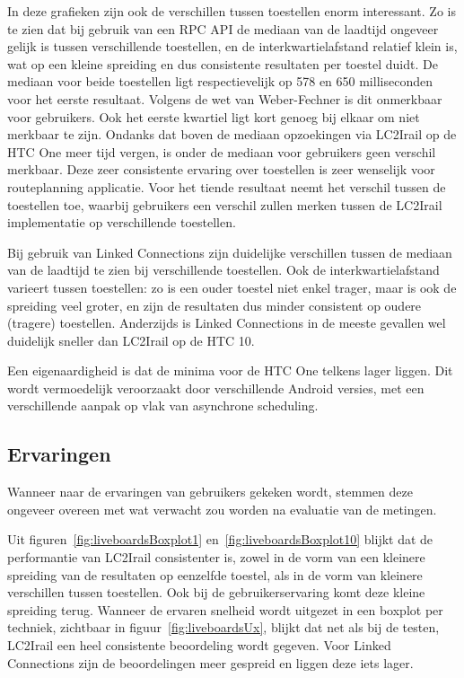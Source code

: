 In deze grafieken zijn ook de verschillen tussen toestellen enorm interessant. Zo is te zien dat bij gebruik van een RPC API de mediaan van de laadtijd ongeveer gelijk is tussen verschillende toestellen, en de interkwartielafstand relatief klein is, wat op een kleine spreiding en dus consistente resultaten per toestel duidt. De mediaan voor beide toestellen ligt respectievelijk op 578 en 650 milliseconden voor het eerste resultaat. Volgens de wet van Weber-Fechner is dit onmerkbaar voor gebruikers. Ook het eerste kwartiel ligt kort genoeg bij elkaar om niet merkbaar te zijn. Ondanks dat boven de mediaan opzoekingen via LC2Irail op de HTC One meer tijd vergen, is onder de mediaan voor gebruikers geen verschil merkbaar. Deze zeer consistente ervaring over toestellen is zeer wenselijk voor routeplanning applicatie. Voor het tiende resultaat neemt het verschil tussen de toestellen toe, waarbij gebruikers een verschil zullen merken tussen de LC2Irail implementatie op verschillende toestellen.

Bij gebruik van Linked Connections zijn duidelijke verschillen tussen de mediaan van de laadtijd te zien bij verschillende toestellen. Ook de interkwartielafstand varieert tussen toestellen: zo is een ouder toestel niet enkel trager, maar is ook de spreiding veel groter, en zijn de resultaten dus minder consistent op oudere (tragere) toestellen. Anderzijds is Linked Connections in de meeste gevallen wel duidelijk sneller dan LC2Irail op de HTC 10.

Een eigenaardigheid is dat de minima voor de HTC One telkens lager liggen. Dit wordt vermoedelijk veroorzaakt door verschillende Android versies, met een verschillende aanpak op vlak van asynchrone scheduling.

\subsection{Ervaringen}
Wanneer naar de ervaringen van gebruikers gekeken wordt, stemmen deze ongeveer overeen met wat verwacht zou worden na evaluatie van de metingen.

Uit figuren~\ref{fig:liveboardsBoxplot1} en~\ref{fig:liveboardsBoxplot10} blijkt dat de performantie van LC2Irail consistenter is, zowel in de vorm van een kleinere spreiding van de resultaten op eenzelfde toestel, als in de vorm van kleinere verschillen tussen toestellen. Ook bij de gebruikerservaring komt deze kleine spreiding terug. Wanneer de ervaren snelheid wordt uitgezet in een boxplot per techniek, zichtbaar in figuur~\ref{fig:liveboardsUx}, blijkt dat net als bij de testen, LC2Irail een heel consistente beoordeling wordt gegeven. Voor Linked Connections zijn de beoordelingen meer gespreid en liggen deze iets lager.

